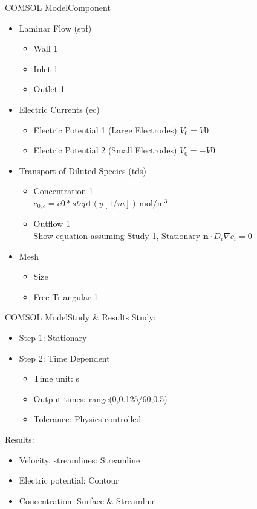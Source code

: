 \documentclass[10pt]{beamer}
\begin{document}
\begin{frame}{COMSOL Model}{Component}
    \begin{itemize}
        \item Laminar Flow (spf)
              \begin{itemize}
                  \item Wall 1
                  \item Inlet 1
                  \item Outlet 1
              \end{itemize}
        \item Electric Currents (ec)
              \begin{itemize}
                  \item Electric Potential 1 (Large Electrodes) $V_0=V0$
                  \item Electric Potential 2 (Small Electrodes) $V_0=-V0$
              \end{itemize}
        \item Transport of Diluted Species (tds)
              \begin{itemize}
                  \item Concentration 1\\
                        $c_{0,c}=c0*step1(y[1/m])\,\mathrm{mol/m^3}$
                  \item Outflow 1\\
                        Show equation assuming Study 1, Stationary $\bm{n}\cdot D_i\nabla c_i=0$
              \end{itemize}
        \item Mesh
              \begin{itemize}
                  \item Size
                  \item Free Triangular 1
              \end{itemize}
        \end{itemize}
\end{frame}
\begin{frame}{COMSOL Model}{Study \& Results}
    Study:
    \begin{itemize}
        \item Step 1: Stationary
        \item Step 2: Time Dependent\\
              \begin{itemize}
                  \item Time unit: s
                  \item Output times: range(0,0.125/60,0.5)
                  \item Tolerance: Physics controlled
              \end{itemize}
    \end{itemize}
    Results:
    \begin{itemize}
        \item Velocity, streamlines: Streamline
        \item Electric potential: Contour
        \item Concentration: Surface \& Streamline
    \end{itemize}
\end{frame}
\end{document}
